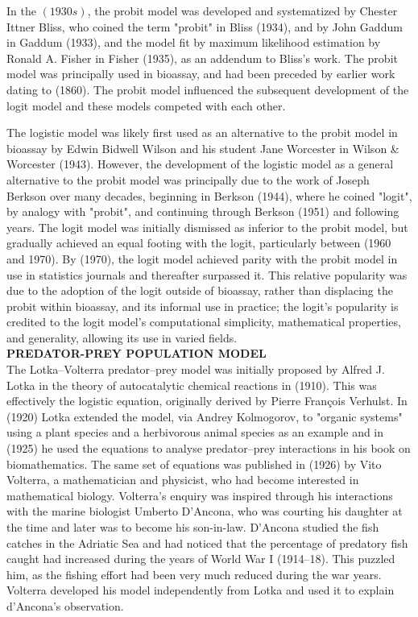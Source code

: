\documentclass[a4paper,12pt]{report}
\numberwithin{equation}{section}
\begin{document}
In the $(1930s)$, the probit model was developed and systematized by Chester Ittner Bliss, who coined the term "probit" in Bliss (1934), and by John Gaddum in Gaddum (1933), and the model fit by maximum likelihood estimation by Ronald A. Fisher in Fisher (1935), as an addendum to Bliss's work. The probit model was principally used in bioassay, and had been preceded by earlier work dating to (1860). The probit model influenced the subsequent development of the logit model and these models competed with each other.

The logistic model was likely first used as an alternative to the probit model in bioassay by Edwin Bidwell Wilson and his student Jane Worcester in Wilson \& Worcester (1943). However, the development of the logistic model as a general alternative to the probit model was principally due to the work of Joseph Berkson over many decades, beginning in Berkson (1944), where he coined "logit", by analogy with "probit", and continuing through Berkson (1951) and following years. The logit model was initially dismissed as inferior to the probit model, but gradually achieved an equal footing with the logit, particularly between (1960 and 1970). By (1970), the logit model achieved parity with the probit model in use in statistics journals and thereafter surpassed it. This relative popularity was due to the adoption of the logit outside of bioassay, rather than displacing the probit within bioassay, and its informal use in practice; the logit's popularity is credited to the logit model's computational simplicity, mathematical properties, and generality, allowing its use in varied fields.\\


\textbf{PREDATOR-PREY POPULATION MODEL}\\
The Lotka–Volterra predator–prey model was initially proposed by Alfred J. Lotka in the theory of autocatalytic chemical reactions in (1910). This was effectively the logistic equation, originally derived by Pierre François Verhulst. In (1920) Lotka extended the model, via Andrey Kolmogorov, to "organic systems" using a plant species and a herbivorous animal species as an example and in (1925) he used the equations to analyse predator–prey interactions in his book on biomathematics. The same set of equations was published in (1926) by Vito Volterra, a mathematician and physicist, who had become interested in mathematical biology. Volterra's enquiry was inspired through his interactions with the marine biologist Umberto D'Ancona, who was courting his daughter at the time and later was to become his son-in-law. D'Ancona studied the fish catches in the Adriatic Sea and had noticed that the percentage of predatory fish caught had increased during the years of World War I (1914–18). This puzzled him, as the fishing effort had been very much reduced during the war years. Volterra developed his model independently from Lotka and used it to explain d'Ancona's observation.
\end{document}
